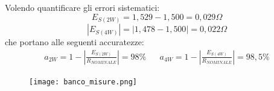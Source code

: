 \begin{table}[!ht]
    \caption{Multimetro 34401A (6$\sfrac{1}{2}$ cifre), 4 Morsetti, R (dei morsetti) = 0,004 $\Omega$}
    \label{tab:mult_4w}
\end{table}
\FloatBarrier


Volendo quantificare gli errori sistematici:
\begin{equation*}
    E_{S(2W)} = 1,529 - 1,500 = 0,029 \Omega
\end{equation*}
\begin{equation*}
   | E_{S(4W)} | = | 1,478 - 1,500 | = 0,022 \Omega
\end{equation*}
che portano alle seguenti accuratezze: 
\begin{align*}
a_{2W} = 1 - \left| \frac{E_{S(2W)}}{R_{NOMINALE}} \right| = 98\%
   &&   
a_{4W} = 1 - \left| \frac{E_{S(4W)}}{R_{NOMINALE}} \right| = 98,5\%
\end{align*}

\begin{figure}[h]
    \centering
    \texttt{[image: banco\_misure.png]}
    \label{fig:range}
\end{figure}
\FloatBarrier

